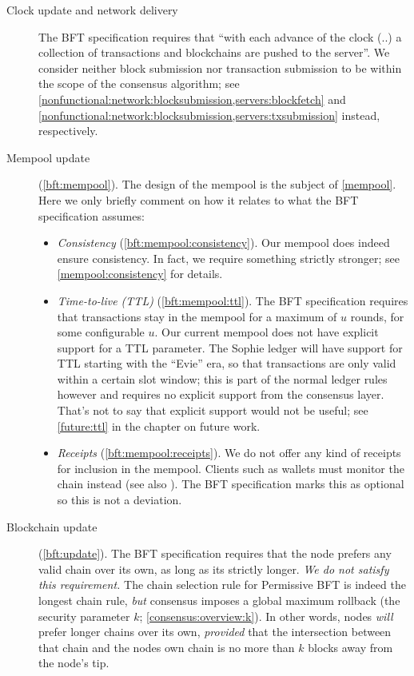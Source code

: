 \begin{description}
  \item[Clock update and network delivery] The BFT specification requires that
  ``with each advance of the clock (..) a collection of transactions and
  blockchains are pushed to the server''. We consider neither block submission
  nor transaction submission to be within the scope of the consensus algorithm;
  see \cref{nonfunctional:network:blocksubmission,servers:blockfetch} and
  \cref{nonfunctional:network:blocksubmission,servers:txsubmission} instead, respectively.

  \item[Mempool update] (\cref{bft:mempool}). The design of the mempool is the
  subject of \cref{mempool}. Here we only briefly comment on how it relates to
  what the BFT specification assumes:
%
  \begin{itemize}
    \item \textit{Consistency} (\cref{bft:mempool:consistency}). Our mempool
    does indeed ensure consistency. In fact, we require something strictly
    stronger; see \cref{mempool:consistency} for details.
    \item \textit{Time-to-live (TTL)} (\cref{bft:mempool:ttl}). The BFT
    specification requires that transactions stay in the mempool for a maximum
    of $u$ rounds, for some configurable $u$. Our current mempool does not have
    explicit support for a TTL parameter. The Sophie ledger will have support
    for TTL starting with the ``Evie'' era, so that transactions are only
    valid within a certain slot window; this is part of the normal ledger rules
    however and requires no explicit support from the consensus layer. That's
    not to say that explicit support would not be useful; see \cref{future:ttl}
    in the chapter on future work.
    \item \textit{Receipts} (\cref{bft:mempool:receipts}). We do not offer any
    kind of receipts for inclusion in the mempool. Clients such as wallets must
    monitor the chain instead (see also \cite{wallet-spec}). The BFT
    specification marks this as optional so this is not a deviation.
  \end{itemize}
%
  \item[Blockchain update] (\cref{bft:update}). The BFT specification requires
  that the node prefers any valid chain over its own, as long as its strictly
  longer. \emph{We do not satisfy this requirement.} The chain selection rule
  for Permissive BFT is indeed the longest chain rule, \emph{but} consensus
  imposes a global maximum rollback (the security parameter $k$;
  \cref{consensus:overview:k}). In other words, nodes \emph{will} prefer longer
  chains over its own, \emph{provided} that the intersection between that chain
  and the nodes own chain is no more than $k$ blocks away from the node's tip.


\end{description}
